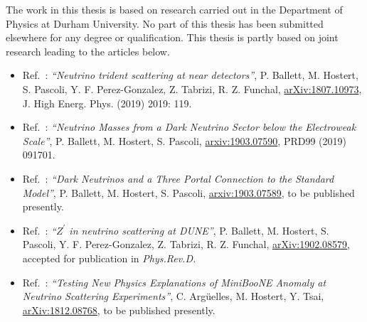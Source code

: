 \documentclass[openany,twoside,frontopenright,openright]{ip3thesis}
\begin{document}
\begin{declaration*}
%
	The work in this thesis is based on research carried out in the Department of
	Physics at Durham University. No part of this thesis has been
	submitted elsewhere for any degree or qualification. This thesis is partly based on joint research leading to the articles below.
	\begin{itemize}
	 \item Ref.~\cite{Ballett:2018uuc}: \textit{``Neutrino trident scattering at near detectors''}, P. Ballett, M. Hostert, S. Pascoli, Y. F. Perez-Gonzalez, Z. Tabrizi, R. Z. Funchal, \href{https://arxiv.org/abs/1807.10973}{arXiv:1807.10973}, J. High Energ. Phys. (2019) 2019: 119.
	 \item Ref.~\cite{Ballett:2019cqp}: \textit{``Neutrino Masses from a Dark Neutrino Sector below the Electroweak Scale''}, P. Ballett, M. Hostert, S. Pascoli, \href{https://arxiv.org/abs/1903.07590}{arxiv:1903.07590}, PRD99 (2019) 091701.
	\end{itemize}
	\begin{itemize}
	\item Ref.~\cite{Ballett:2019pyw}: \textit{``Dark Neutrinos and a Three Portal Connection to the Standard Model''}, P. Ballett, M. Hostert, S. Pascoli, \href{https://arxiv.org/abs/1903.07589}{arxiv:1903.07589}, to be published presently.
	\item Ref.~\cite{Ballett:2019xoj}: \textit{``$Z^\prime$ in neutrino scattering at DUNE''}, P. Ballett, M. Hostert, S. Pascoli, Y. F. Perez-Gonzalez, Z. Tabrizi, R. Z. Funchal, \href{https://arxiv.org/abs/1902.08579}{arXiv:1902.08579}, accepted for publication in \emph{Phys.Rev.D.}
 	\end{itemize}
	\begin{itemize}
	\item Ref.~\cite{Arguelles:2018mtc}: \textit{``Testing New Physics Explanations of MiniBooNE Anomaly at Neutrino Scattering Experiments''}, C. Arg\"uelles, M. Hostert, Y. Tsai, \href{https://arxiv.org/abs/1812.08768}{arXiv:1812.08768}, to be published presently.
	\end{itemize}
\end{declaration*}
\end{document}

